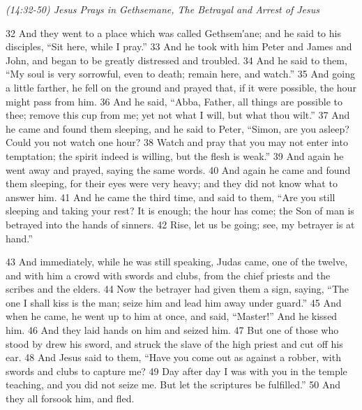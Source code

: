 \documentclass[letterpaper]{report}
\begin{document}
{\centering
	\emph{(14:32-50) Jesus Prays in Gethsemane, The Betrayal and Arrest of Jesus}\\
}
\begin{multicols}{2}
32 And they went to a place which was called Gethsem′ane; and he said to his disciples, “Sit here, while I pray.” 33 And he took with him Peter and James and John, and began to be greatly distressed and troubled. 34 And he said to them, “My soul is very sorrowful, even to death; remain here, and watch.” 35 And going a little farther, he fell on the ground and prayed that, if it were possible, the hour might pass from him. 36 And he said, “Abba, Father, all things are possible to thee; remove this cup from me; yet not what I will, but what thou wilt.” 37 And he came and found them sleeping, and he said to Peter, “Simon, are you asleep? Could you not watch one hour? 38 Watch and pray that you may not enter into temptation; the spirit indeed is willing, but the flesh is weak.” 39 And again he went away and prayed, saying the same words. 40 And again he came and found them sleeping, for their eyes were very heavy; and they did not know what to answer him. 41 And he came the third time, and said to them, “Are you still sleeping and taking your rest? It is enough; the hour has come; the Son of man is betrayed into the hands of sinners. 42 Rise, let us be going; see, my betrayer is at hand.”

43 And immediately, while he was still speaking, Judas came, one of the twelve, and with him a crowd with swords and clubs, from the chief priests and the scribes and the elders. 44 Now the betrayer had given them a sign, saying, “The one I shall kiss is the man; seize him and lead him away under guard.” 45 And when he came, he went up to him at once, and said, “Master!” And he kissed him. 46 And they laid hands on him and seized him. 47 But one of those who stood by drew his sword, and struck the slave of the high priest and cut off his ear. 48 And Jesus said to them, “Have you come out as against a robber, with swords and clubs to capture me? 49 Day after day I was with you in the temple teaching, and you did not seize me. But let the scriptures be fulfilled.” 50 And they all forsook him, and fled.
\end{multicols}
\end{document}
